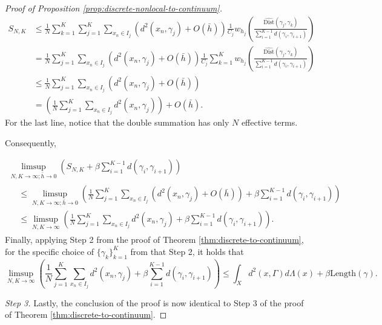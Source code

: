 \documentclass[10pt,a4paper]{amsart}
\begin{document}
\begin{proof}[Proof of Proposition \ref{prop:discrete-nonlocal-to-continuum}]
\begin{align*}
 S_{N,K} & \leq\frac{1}{N}\sum_{k=1}^{K}\sum_{j=1}^{K}\sum_{x_{n}\in I_{j}}\left(d^{2}(x_{n},\gamma_{j})+ O(\bar h)
\right)\frac{1}{C_{j}}w_{h_{j}}\left(\frac{\widehat{\text{Dist}}(\gamma_{j},\gamma_{k})}{\sum_{i=1}^{K-1}d(\gamma_{i},\gamma_{i+1})}\right)\\
 & =\frac{1}{N}\sum_{j=1}^{K}\sum_{x_{n}\in I_{j}}\left(d^{2}(x_{n},\gamma_{j})+
 O(\bar h)
 \right)\frac{1}{C_{j}}\sum_{k=1}^{K}w_{h_j}\left(\frac{\widehat{\text{Dist}}(\gamma_{j},\gamma_{k})}{\sum_{i=1}^{K-1}d(\gamma_{i},\gamma_{i+1})}\right)\\
 & \leq \frac{1}{N}\sum_{j=1}^{K}\sum_{x_{n}\in I_{j}}\left(d^{2}(x_{n},\gamma_{j})
 + O(\bar h)
 \right)\\
 & =\left(\frac{1}{N}\sum_{j=1}^{K}\sum_{x_{n}\in I_{j}}d^{2}(x_{n},\gamma_{j})
 \right)+ O(\bar h).
\end{align*}
For the last line, notice that the double summation has only $N$ effective terms.

Consequently,

\begin{multline*}
\limsup_{N,K\rightarrow\infty;\bar{h}\rightarrow0}\left(
 S_{N,K}+\beta\sum_{i=1}^{K-1}d(\gamma_{i},\gamma_{i+1})\right)\\
\begin{aligned}
&
\leq\limsup_{N,K\rightarrow\infty;\bar{h}\rightarrow0}\left(\frac{1}{N}\sum_{j=1}^{K}\sum_{x_{n}\in I_{j}}\left(d^{2}(x_{n},\gamma_{j})+
O(\bar h)
\right)
+\beta\sum_{i=1}^{K-1}d(\gamma_{i},\gamma_{i+1})\right)\\
 & \leq\limsup_{N,K\rightarrow\infty}\left(\frac{1}{N}\sum_{j=1}^{K}\sum_{x_{n}\in I_{j}}d^{2}(x_{n},\gamma_{j})+\beta\sum_{i=1}^{K-1}d(\gamma_{i},\gamma_{i+1})\right).
\end{aligned}
\end{multline*}
Finally, applying Step 2 from the proof of Theorem \ref{thm:discrete-to-continuum}, for the specific choice of $\{\gamma_k\}_{k=1}^K$ from that Step 2, it holds that
\[
\limsup_{N,K\rightarrow \infty}\left(\frac{1}{N}\sum_{j=1}^{K}\sum_{x_{n}\in I_{j}}d^{2}(x_{n},\gamma_{j})+\beta\sum_{i=1}^{K-1}d(\gamma_{i},\gamma_{i+1})\right)\leq\int_{X}d^{2}(x,\Gamma)d\Lambda(x)+\beta\text{Length}(\gamma).
\]

\medskip


 \emph{Step 3.}
Lastly, the conclusion of the proof is now identical to Step 3 of the proof of Theorem \ref{thm:discrete-to-continuum}.
\end{proof}
\end{document}
